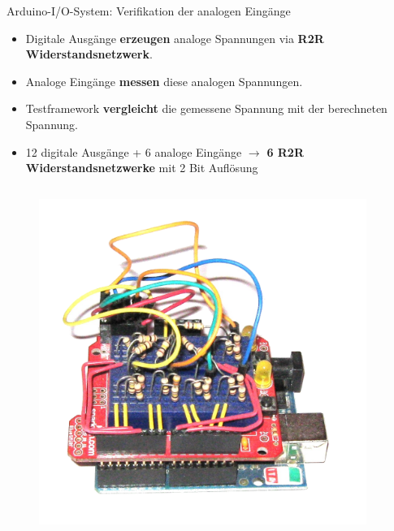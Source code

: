 \documentclass{beamer}
\begin{document}
\begin{frame}{Arduino-I/O-System: Verifikation der analogen Eing\"ange}
	\begin{itemize}
		\item Digitale Ausg\"ange \textbf{erzeugen} analoge Spannungen via \textbf{R2R Widerstandsnetzwerk}.
		\item Analoge Eing\"ange \textbf{messen} diese analogen Spannungen.
		\item Testframework \textbf{vergleicht} die gemessene Spannung mit der berechneten Spannung.
	\end{itemize}
	\begin{itemize}
		\item 12 digitale Ausg\"ange + 6 analoge Eing\"ange $\rightarrow$ \textbf{6 R2R Widerstandsnetzwerke} mit 2 Bit Aufl\"osung
	\end{itemize}
	\begin{columns}
		\begin{column}{0.4\textwidth}
			\begin{figure}[htbp]
				\centering
				\includegraphics[scale=0.2]{./images/arduinoio-r2r.png}
			\end{figure}
		\end{column}
		\begin{column}{0.4\textwidth}

\end{column}
\end{columns}
\end{frame}
\end{document}
